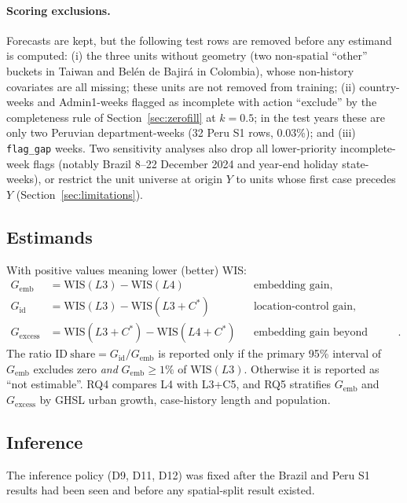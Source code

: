 \documentclass[11pt]{article}
\newcommand{\WIS}{\mathrm{WIS}}
\newcommand{\Gemb}{G_{\mathrm{emb}}}
\newcommand{\Gid}{G_{\mathrm{id}}}
\newcommand{\Gex}{G_{\mathrm{excess}}}
\newcommand{\Cstar}{C^{\ast}}
\begin{document}
\paragraph{Scoring exclusions.}
Forecasts are kept, but the following test rows are removed before any estimand is computed:
(i) the three units without geometry (two non-spatial ``other'' buckets in Taiwan and Bel\'en de
Bajir\'a in Colombia), whose non-history covariates are all missing; these units are not removed from
training; (ii) country-weeks and Admin1-weeks flagged as incomplete with action ``exclude'' by the
completeness rule of Section~\ref{sec:zerofill} at $k=0.5$; in the test years these are only two
Peruvian department-weeks (32 Peru S1 rows, 0.03\%); and (iii) \texttt{flag\_gap} weeks. Two
sensitivity analyses also drop all lower-priority incomplete-week flags (notably Brazil 8--22 December
2024 and year-end holiday state-weeks), or restrict the unit universe at origin $Y$ to units whose first
case precedes $Y$ (Section~\ref{sec:limitations}).

\subsection{Estimands}
With positive values meaning lower (better) WIS:
\begin{align*}
\Gemb &= \WIS(L3) - \WIS(L4) &&\text{embedding gain},\\
\Gid  &= \WIS(L3) - \WIS(L3{+}\Cstar) &&\text{location-control gain},\\
\Gex  &= \WIS(L3{+}\Cstar) - \WIS(L4{+}\Cstar) &&\text{embedding gain beyond location (primary)}.
\end{align*}
The ratio $\mathrm{ID\ share}=\Gid/\Gemb$ is reported only if the primary 95\% interval of $\Gemb$
excludes zero \emph{and} $\Gemb\geq 1\%$ of $\WIS(L3)$. Otherwise it is reported as ``not estimable''.
RQ4 compares L4 with L3+C5, and RQ5 stratifies $\Gemb$ and $\Gex$ by GHSL urban growth, case-history
length and population.

\subsection{Inference}
\label{sec:inference}
The inference policy (D9, D11, D12) was fixed after the Brazil and Peru S1 results had been seen and
before any spatial-split result existed.
\end{document}
